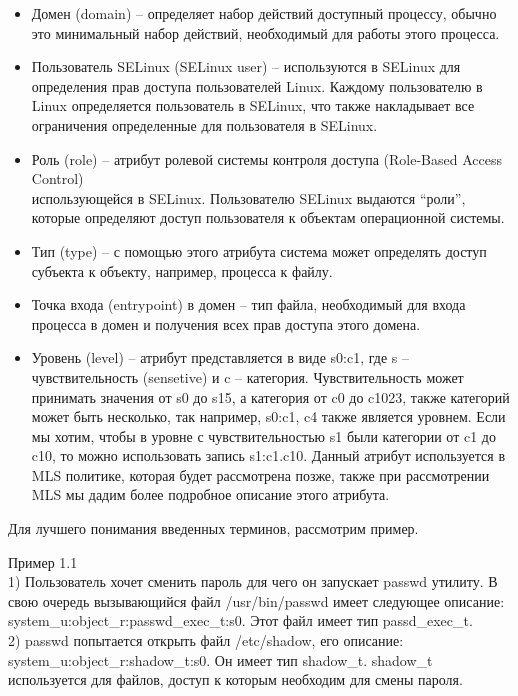 \documentclass{article}
\begin{document}
\begin{itemize}
\item Домен (domain) – определяет набор действий доступный процессу, обычно это минимальный набор действий, необходимый для работы этого процесса.
\item Пользователь SELinux (SELinux user) – используются в SELinux для определения прав доступа пользователей Linux. Каждому пользователю в Linux определяется пользователь в SELinux, что также накладывает все ограничения определенные для пользователя в SELinux.
\item Роль (role) – атрибут ролевой системы контроля доступа (Role-Based Access Control)\\ использующейся в SELinux. Пользователю SELinux выдаются “роли”, которые определяют доступ пользователя к объектам операционной системы.
\item Тип (type) – с помощью этого атрибута система может определять доступ субъекта к объекту, например, процесса к файлу.
\item Точка входа (entrypoint) в домен – тип файла, необходимый для входа процесса в домен и получения всех прав доступа этого домена.
\item Уровень (level) – атрибут представляется в виде s0:c1, где s – чувствительность (sensetive) и c – категория. Чувствительность может принимать значения от s0 до s15, а категория от c0 до c1023, также категорий может быть несколько, так например, s0:c1, c4 также является уровнем. Если мы хотим, чтобы в уровне с чувствительностью s1 были категории от c1 до c10, то можно использовать запись s1:c1.c10. Данный атрибут используется в MLS политике, которая будет рассмотрена позже, также при рассмотрении MLS мы дадим более подробное описание этого атрибута.
\end{itemize}
Для лучшего понимания введенных терминов, рассмотрим пример.

Пример 1.1\\

1) Пользователь хочет сменить пароль для чего он запускает passwd утилиту. В свою очередь вызывающийся файл /usr/bin/passwd имеет следующее описание:\\ system\_u:object\_r:passwd\_exec\_t:s0.
Этот файл имеет тип passd\_exec\_t.\\

2) passwd попытается открыть файл /etc/shadow, его описание: system\_u:object\_r:shadow\_t:s0.
Он имеет тип shadow\_t. shadow\_t используется для файлов, доступ к которым необходим для смены пароля.\\
\end{document}
